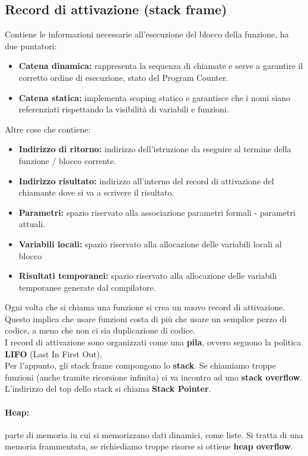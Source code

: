 \documentclass[a4paper,12pt]{article}
\begin{document}
\subsection{Record di attivazione (stack frame)}
Contiene le informazioni necessarie all'esecuzione del blocco della funzione, ha due puntatori:
\begin{itemize}
  \item \textbf{Catena dinamica: } rappresenta la sequenza di chiamate e serve a garantire il corretto ordine di esecuzione, stato del Program Counter.
  \item \textbf{Catena statica: } implementa scoping statico e garantisce che i nomi siano referenziati rispettando la visibilità di variabili e funzioni.
\end{itemize}
Altre cose che contiene:
\begin{itemize}
  \item \textbf{Indirizzo di ritorno:} indirizzo dell'istruzione da eseguire al termine della funzione / blocco corrente.
  \item \textbf{Indirizzo risultato:} indirizzo all'interno del record di attivazione del chiamante dove si va a scrivere il risultato.
  \item \textbf{Parametri:} spazio riservato alla associazione parametri formali - parametri attuali.
  \item \textbf{Variabili locali:} spazio riservato alla allocazione delle variabili locali al blocco
  \item \textbf{Risultati temporanei:} spazio riservato alla allocazione delle variabili temporanee generate dal compilatore.
\end{itemize}
Ogni volta che si chiama una funzione si crea un nuovo record di attivazione.\\
Questo implica che usare funzioni costa di più che usare un semplice pezzo di codice, a meno che non ci sia duplicazione di codice.\\
I record di attivazione sono organizzati come una \textbf{pila}, ovvero seguono la politica \textbf{LIFO} (Last In First Out).\\
Per l'appunto, gli stack frame compongono lo \textbf{stack}. Se chiamiamo troppe funzioni (anche  tramite ricorsione infinita) si va incontro ad uno \textbf{stack overflow}.\\
L'indirizzo del top dello stack si chiama \textbf{Stack Pointer}.
\paragraph{Heap: } parte di memoria in cui si memorizzano dati dinamici, come liste. Si tratta di una memoria frammentata, se richiediamo troppe risorse si ottiene \textbf{heap overflow}.
\end{document}
